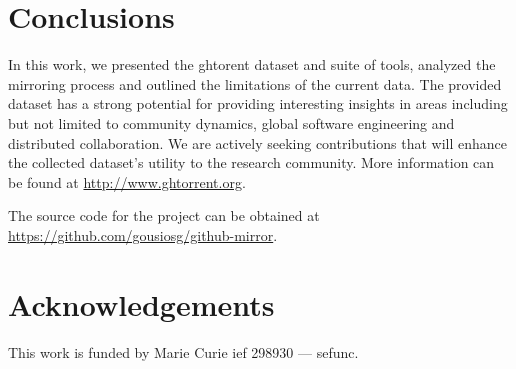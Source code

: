 \documentclass[conference]{IEEEtran}
\begin{document}
\section{Conclusions}

In this work, we presented the {\sc ght}orent dataset and suite of tools, analyzed
the mirroring process and outlined the limitations of the current data.  The
provided dataset has a strong potential for providing interesting insights in
areas including but not limited to community dynamics, global software
engineering and distributed collaboration. We are actively seeking contributions
that will enhance the collected dataset's utility to the research community. 
More information can be found at \url{http://www.ghtorrent.org}.

The source code for the project can be obtained at \url{https://github.com/gousiosg/github-mirror}.

\section*{Acknowledgements}
This work is funded by Marie Curie {\sc ief} 298930 --- {\sc sefunc}.



\end{document}
